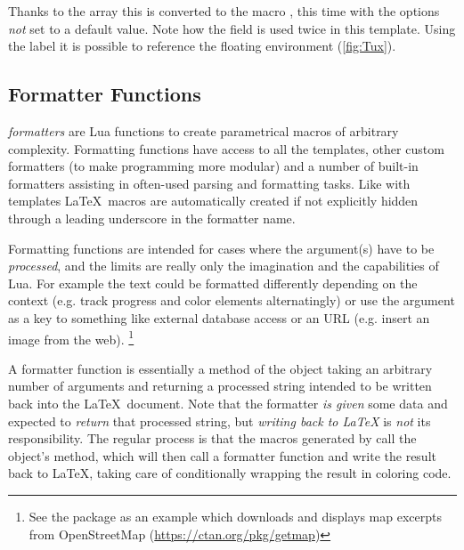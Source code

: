 \documentclass{scrartcl}
\begin{document}
\noindent Thanks to the  array this is converted to the macro
, this time with the options \emph{not} set to a
default value.  Note how the  field is used twice in this
template.  Using the label  it is possible to reference the
floating environment (\vref{fig:Tux}).




\subsection{Formatter Functions}
\label{sec:formatter-functions}

\emph{formatters} are Lua functions to create parametrical macros of arbitrary
complexity.  Formatting functions have access to all the templates, other custom
formatters (to make programming more modular) and a number of built-in
formatters assisting in often-used parsing and formatting tasks.  Like with
templates \LaTeX\ macros are automatically created if not explicitly hidden
through a leading underscore in the formatter name.

Formatting functions are intended for cases where the argument(s) have to be
\emph{processed}, and the limits are really only the imagination and the
capabilities of Lua.  For example the text could be formatted differently
depending on the context (e.g. track progress and color elements alternatingly)
or use the argument as a key to something like external database access or an
URL (e.g. insert an image from the web).%
\footnote{See the  package as an example which downloads and
displays map excerpts from OpenStreetMap (\url{https://ctan.org/pkg/getmap})}

\medskip

A formatter function is essentially a method of the  object
taking an arbitrary number of arguments and returning a processed string
intended to be written back into the \LaTeX\ document.  Note that the formatter
\emph{is given} some data and expected to \emph{return} that processed string,
but \emph{writing back to \LaTeX} is \emph{not} its responsibility.  The regular
process is that the macros generated by  call the object's
 method, which will then call a formatter function and write the
result back to \LaTeX, taking care of conditionally wrapping the result in
coloring code.
\end{document}
